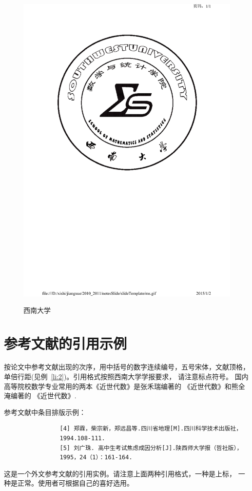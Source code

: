 \begin{figure}
{{{						\includegraphics{preample/ms}\label{fig:22}
			}}}\\
			\caption{西南大学}
		\end{figure}
		\section{参考文献的引用示例}\label{sec_si4}
		按论文中参考文献出现的次序，用中括号的数字连续编号，五号宋体，文献顶格，单倍行距(见例~\ref{li:2})。引用格式按照西南大学学报要求，
		请注意标点符号。
		国内高等院校数学专业常用的两本《近世代数》是张禾瑞编著的
		《近世代数》\cite{zhang}和熊全淹编著的 《近世代数》\cite{xiong}.
		\begin{example}\label{li:2}
			参考文献中条目排版示例：
			\begin{verbatim}
				[4] 郑霖，柴宗新，郑远昌等.四川省地理[M].四川科学技术出版社，
				1994.108-111.
				[5] 刘广珠. 高中生考试焦虑成因分析[J].陕西师大学报（哲社版），
				1995，24（1）：161-164.
			\end{verbatim}
		\end{example}
		这是一个外文参考文献的引用实例。请注意上面两种引用格式，一种是上标， 一种是正常。使用者可根据自己的喜好选用。
		
